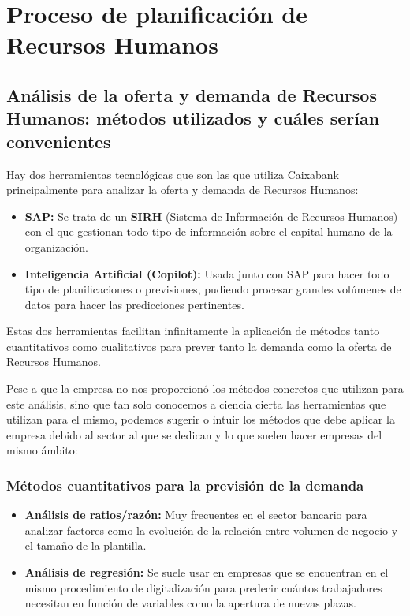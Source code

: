 \section{Proceso de planificación de Recursos Humanos}

\subsection{Análisis de la oferta y demanda de Recursos Humanos: métodos utilizados y cuáles serían convenientes}

Hay dos herramientas tecnológicas que son las que utiliza Caixabank principalmente para analizar la oferta y demanda de Recursos Humanos:

\begin{itemize}
  \item \textbf{SAP:} Se trata de un \textbf{SIRH} (Sistema de Información de Recursos Humanos) con el que gestionan todo tipo de información sobre el capital humano de la organización.
  \item \textbf{Inteligencia Artificial (Copilot):} Usada junto con SAP para hacer todo tipo de planificaciones o previsiones, pudiendo procesar grandes volúmenes de datos para hacer las predicciones pertinentes.
\end{itemize}

Estas dos herramientas facilitan infinitamente la aplicación de métodos tanto cuantitativos como cualitativos para prever tanto la demanda como la oferta de Recursos Humanos.

\vspace{0.5cm}
Pese a que la empresa no nos proporcionó los métodos concretos que utilizan para este análisis, sino que tan solo conocemos a ciencia cierta las herramientas que utilizan para el mismo, podemos sugerir o intuir los métodos que debe aplicar la empresa debido al sector al que se dedican y lo que suelen hacer empresas del mismo ámbito:

\subsubsection{Métodos cuantitativos para la previsión de la demanda}

\begin{itemize}
  \item \textbf{Análisis de ratios/razón:} Muy frecuentes en el sector bancario para analizar factores como la evolución de la relación entre volumen de negocio y el tamaño de la plantilla.
  \item \textbf{Análisis de regresión:} Se suele usar en empresas que se encuentran en el mismo procedimiento de digitalización para predecir cuántos trabajadores necesitan en función de variables como la apertura de nuevas plazas.
\end{itemize}

